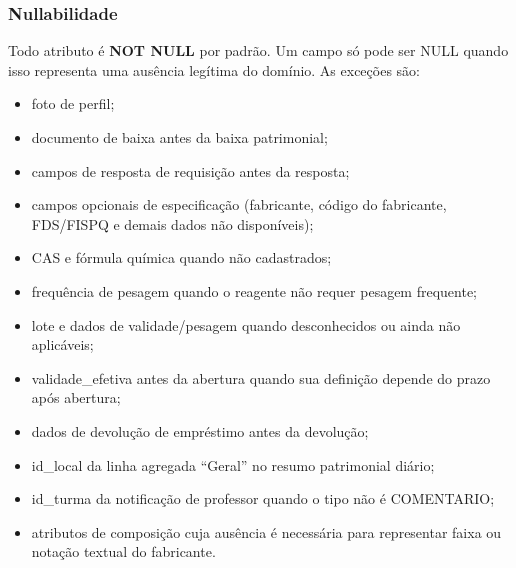 \documentclass[12pt,a4paper]{article}
\begin{document}
\subsubsection{Nullabilidade}
Todo atributo é \textbf{NOT NULL} por padrão. Um campo só pode ser NULL quando isso representa uma ausência legítima do domínio. As exceções são:
\begin{itemize}
    \item foto de perfil;
    \item documento de baixa antes da baixa patrimonial;
    \item campos de resposta de requisição antes da resposta;
    \item campos opcionais de especificação (fabricante, código do fabricante, FDS/FISPQ e demais dados não disponíveis);
    \item CAS e fórmula química quando não cadastrados;
    \item frequência de pesagem quando o reagente não requer pesagem frequente;
    \item lote e dados de validade/pesagem quando desconhecidos ou ainda não aplicáveis;
    \item validade\_efetiva antes da abertura quando sua definição depende do prazo após abertura;
    \item dados de devolução de empréstimo antes da devolução;
    \item id\_local da linha agregada ``Geral'' no resumo patrimonial diário;
    \item id\_turma da notificação de professor quando o tipo não é COMENTARIO;
    \item atributos de composição cuja ausência é necessária para representar faixa ou notação textual do fabricante.
\end{itemize}
\end{document}
